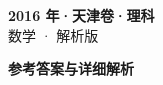 \documentclass[zihao=-4, a4paper]{ctexart}
\begin{document}
\begin{center}
  {\Large\bfseries 2016 年·天津卷·理科}\\[4pt]
  {\large 数学 · 解析版}
\end{center}
\medskip
{}

\clearpage
{}
\begin{center}{\Large\bfseries 参考答案与详细解析}\end{center}
\medskip

\end{document}
